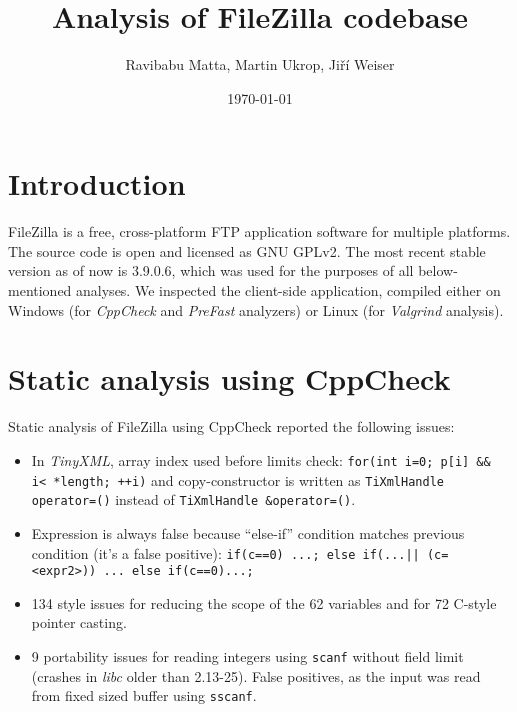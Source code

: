 \documentclass[11pt]{article}
\begin{document}
\title{Analysis of FileZilla codebase}
\date{\today}
\author{Ravibabu Matta, Martin Ukrop, Jiří Weiser}
\maketitle

\section{Introduction}

FileZilla is a free, cross-platform FTP application software for multiple platforms. The source code is open and licensed as GNU GPLv2. The most recent stable version as of now is 3.9.0.6, which was used for the purposes of all below-mentioned analyses. We inspected the client-side application, compiled either on Windows (for \textit{CppCheck} and \textit{PreFast} analyzers) or Linux (for \textit{Valgrind} analysis).

\section{Static analysis using CppCheck}
Static analysis of FileZilla using CppCheck reported the following issues:
\begin{itemize}[topsep=0pt, itemsep=0pt]
 \item In \textit{TinyXML}, array index used before limits check: \texttt{for(int i=0; p[i] \&\& i< *length; ++i)} and copy-constructor is written as \texttt{TiXmlHandle operator=()} instead of \texttt{TiXmlHandle \&operator=()}.
 \item Expression is always false because ``else-if'' condition matches previous condition (it's a false positive): \texttt{if(c==0) ...; else if(...|| (c=<expr2>)) ... else if(c==0)...;} 
 \item 134 style issues for reducing the scope of the 62 variables and for 72 C-style pointer casting.
 \item 9 portability issues for reading integers using \texttt{scanf} without field limit (crashes in \textit{libc} older than 2.13-25). False positives, as the input was read from fixed sized buffer using \texttt{sscanf}.
\end{itemize}
\end{document}
